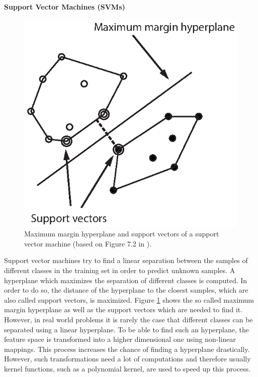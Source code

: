 \paragraph{Support Vector Machines (SVMs)}

\begin{figure}
	\centering
	\includegraphics{img/support_vector_machine_example.eps}

	\caption{Maximum margin hyperplane and support vectors of a support vector machine (based on Figure 7.2 in \cite{Hall2016_DataMining_ML}).}
	\label{fig:max_hyperplane}
\end{figure}

Support vector machines try to find a linear separation between the samples of different classes in the training set in order to predict unknown samples. A hyperplane which maximizes the separation of different classes is computed. In order to do so, the distance of the hyperplane to the closest samples, which are also called support vectors, is maximized. Figure \ref{fig:max_hyperplane} shows the so called maximum margin hyperplane as well as the support vectors which are needed to find it. However, in real world problems it is rarely the case that different classes can be separated using a linear hyperplane. To be able to find such an hyperplane, the feature space is transformed into a higher dimensional one using non-linear mappings. This process increases the chance of finding a hyperplane drastically. However, such transformations need a lot of computations and therefore usually kernel functions, such as a polynomial kernel, are used to speed up this process. 




